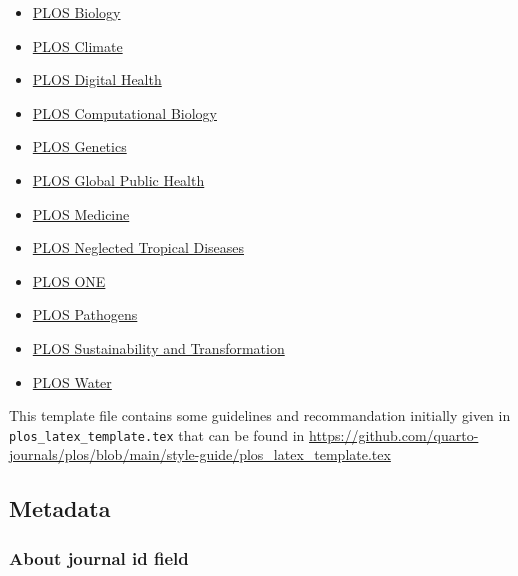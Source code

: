 \documentclass[
  10pt,
  letterpaper,
]{article}
\providecommand{\tightlist}{%
  \setlength{\itemsep}{0pt}\setlength{\parskip}{0pt}}
\begin{document}
\begin{itemize}
\tightlist
\item
  \href{https://journals.plos.org/plosbiology/s/submission-guidelines}{PLOS
  Biology}
\item
  \href{https://journals.plos.org/climate/s/submission-guidelines}{PLOS
  Climate}
\item
  \href{https://journals.plos.org/digitalhealth/s/submission-guidelines}{PLOS
  Digital Health}
\item
  \href{https://journals.plos.org/ploscompbiol/s/submission-guidelines}{PLOS
  Computational Biology}
\item
  \href{https://journals.plos.org/plosgenetics/s/submission-guidelines}{PLOS
  Genetics}
\item
  \href{https://journals.plos.org/globalpublichealth/s/submission-guidelines}{PLOS
  Global Public Health}
\item
  \href{https://journals.plos.org/plosmedicine/s/submission-guidelines}{PLOS
  Medicine}
\item
  \href{https://journals.plos.org/plosntds/s/submission-guidelines}{PLOS
  Neglected Tropical Diseases}
\item
  \href{https://journals.plos.org/plosone/s/submission-guidelines}{PLOS
  ONE}
\item
  \href{https://journals.plos.org/plospathogens/s/submission-guidelines}{PLOS
  Pathogens}
\item
  \href{https://journals.plos.org/sustainabilitytransformation/s/submission-guidelines}{PLOS
  Sustainability and Transformation}
\item
  \href{https://journals.plos.org/water/s/submission-guidelines}{PLOS
  Water}
\end{itemize}

This template file contains some guidelines and recommandation initially
given in \texttt{plos\_latex\_template.tex} that can be found in
\url{https://github.com/quarto-journals/plos/blob/main/style-guide/plos_latex_template.tex}

\subsection{Metadata}\label{metadata}

\subsubsection{About journal id field}\label{about-journal-id-field}
\end{document}
